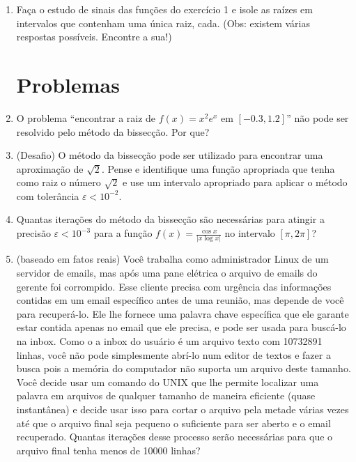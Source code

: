 \documentclass[a4paper]{article}
\begin{document}
\begin{enumerate}
\item Faça o estudo de sinais das funções do exercício 1 e isole as
  raízes em intervalos que contenham uma única raiz, cada. (Obs:
  existem várias respostas possíveis. Encontre a sua!)

\section{Problemas}


\item O problema ``encontrar a raiz de $f(x) = x^2 e^x$ em
  $[-0.3,1.2]$'' não pode ser resolvido pelo método da bissecção. Por
  que?

\item (Desafio) O método da bissecção pode ser utilizado para
  encontrar uma aproximação de $\sqrt{2}$. Pense e identifique uma
  função apropriada que tenha como raiz o número $\sqrt{2}$ e use um
  intervalo apropriado para aplicar o método com tolerância
  $\varepsilon<10^{-2}$.

\item Quantas iterações do método da bissecção são necessárias para
  atingir a precisão $\varepsilon<10^{-3}$ para a função $f(x)=
  \frac{\cos x}{| x \log x |}$ no intervalo $\left[\pi, 2\pi \right]$?

\item (baseado em fatos reais) Você trabalha como administrador Linux
  de um servidor de emails, mas após uma pane elétrica o arquivo de
  emails do gerente foi corrompido. Esse cliente precisa com urgência
  das informações contidas em um email específico antes de uma
  reunião, mas depende de você para recuperá-lo. Ele lhe fornece uma
  palavra chave específica que ele garante estar contida apenas no
  email que ele precisa, e pode ser usada para buscá-lo na inbox. Como
  o a inbox do usuário é um arquivo texto com 10732891 linhas, você
  não pode simplesmente abrí-lo num editor de textos e fazer a busca
  pois a memória do computador não suporta um arquivo deste
  tamanho. Você decide usar um comando do UNIX que lhe permite
  localizar uma palavra em arquivos de qualquer tamanho de maneira
  eficiente (quase instantânea) e decide usar isso para cortar o
  arquivo pela metade várias vezes até que o arquivo final seja
  pequeno o suficiente para ser aberto e o email recuperado. Quantas
  iterações desse processo serão necessárias para que o arquivo final
  tenha menos de 10000 linhas?
\end{enumerate}
\end{document}
